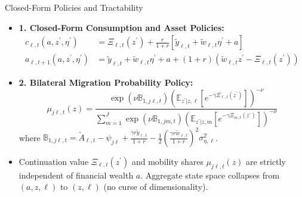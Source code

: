 \documentclass[aspectratio=169, 10pt]{beamer}
\begin{document}
\begin{frame}{Closed-Form Policies and Tractability \hfill \hyperlink{backup:prop1_proof}{\scriptsize{}}}\label{main:prop1}
    \begin{itemize}\small\setlength{\itemsep}{2pt}
        \item \textbf{1. Closed-Form Consumption and Asset Policies:}
        \begin{align*}
        c_{\ell,t}(a, z^\prime, \eta^\prime) &= \Xi_{\ell,t}(z^\prime) + \tfrac{r}{1+r} \left[ \tilde{y}_{\ell,t} + \tilde{w}_{\ell,t}\eta^\prime + a \right] \\
        a_{\ell,t+1}(a, z^\prime, \eta^\prime) &= \tilde{y}_{\ell,t} + \tilde{w}_{\ell,t}\eta^\prime + a + (1+r)(\tilde{w}_{\ell,t}z^\prime - \Xi_{\ell,t}(z^\prime))
        \end{align*}
        \item \textbf{2. Bilateral Migration Probability Policy:}
        $$\mu_{j\ell,t}(z) = \frac{ \exp\left(\nu \mathbb{B}_{1,j\ell,t}\right) \left(\mathbb{E}_{z^\prime | z, \ell} \left[ e^{-\gamma \Xi_{\ell,t}(z^\prime)} \right]\right)^{-\nu} }{ \sum_{m=1}^J \exp\left(\nu \mathbb{B}_{1,jm,t}\right) \left(\mathbb{E}_{z^\prime | z, m} \left[ e^{-\gamma \Xi_{m,t}(z^\prime)} \right]\right)^{-\nu} }$$
        where $\mathbb{B}_{1,j\ell,t} = \tilde{A}_{\ell,t} - \psi_{j\ell} + \frac{\gamma r \tilde{y}_{\ell,t}}{1+r} - \frac{1}{2}\left(\frac{\gamma r \tilde{w}_{\ell,t}}{1+r}\right)^2 \sigma_{\eta,\ell}^2$.
    \end{itemize}
    \vspace{0.02cm}
    \begin{tcolorbox}[takeawaybox, title=Tractability Breakthrough]
        \footnotesize
        \begin{itemize}\setlength{\itemsep}{1pt}
            \item Continuation value $\Xi_{\ell,t}(z^\prime)$ and mobility shares $\mu_{j\ell,t}(z)$ are strictly independent of financial wealth $a$. Aggregate state space collapses from $(a, z, \ell)$ to $(z, \ell)$ (no curse of dimensionality).
        \end{itemize}
    \end{tcolorbox}
\end{frame}
\end{document}
